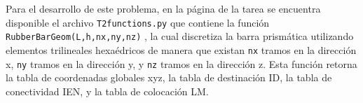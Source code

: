 \documentclass[11pt,letterpaper]{article}
\begin{document}
 Para el desarrollo de este problema, en la p\'agina de la tarea se encuentra disponible el archivo {\tt T2functions.py}
 que contiene la funci\'on {\tt RubberBarGeom(L,h,nx,ny,nz)} , la cual discretiza la barra prism\'atica utilizando elementos trilineales hexa\'edricos de manera que existan {\tt nx} tramos en la direcci\'on x, {\tt ny} tramos en la direcci\'on y, y {\tt nz} tramos en la direcci\'on z. Esta funci\'on retorna la
 tabla de coordenadas globales xyz, la tabla de destinaci\'on ID, la tabla de conectividad IEN, y la tabla de
 colocaci\'on LM.
\end{document}
